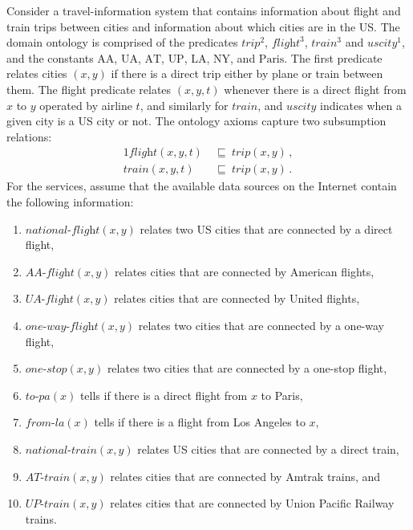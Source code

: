 \documentclass{llncs}
\newcommand{\orule}{\sqsubseteq}
\newcommand{\trip}{\textit{trip}}
\newcommand{\AAflight}{\textit{AA-flight}}
\newcommand{\UAflight}{\textit{UA-flight}}
\newcommand{\ATtrain}{\textit{AT-train}}
\newcommand{\UPtrain}{\textit{UP-train}}
\newcommand{\flight}{\textit{flight}}
\newcommand{\train}{\textit{train}}
\newcommand{\UScity}{\textit{uscity}}
\renewcommand{\AA}{\text{AA}}
\newcommand{\UA}{\text{UA}}
\newcommand{\AT}{\text{AT}}
\newcommand{\UP}{\text{UP}}
\newcommand{\PA}{\text{Paris}}
\newcommand{\NY}{\text{NY}}
\newcommand{\LA}{\text{LA}}
\newcommand{\nationaltlight}{\textit{national-flight}}
\newcommand{\onewayflight}{\textit{one-way-flight}}
\newcommand{\nationaltrain}{\textit{national-train}}
\newcommand{\onestop}{\textit{one-stop}}
\newcommand{\toPA}{\textit{to-pa}}
\newcommand{\fromLA}{\textit{from-la}}
\begin{document}
Consider a travel-information system that contains information about
flight and train trips between cities and information about which cities
are in the US. The domain ontology is comprised of the predicates
$\trip^2$, $\flight^3$, $\train^3$ and $\UScity^1$, and the constants
$\AA$, $\UA$, $\AT$, $\UP$, $\LA$, $\NY$, and $\PA$.
The first predicate relates cities $(x,y)$ if there is a direct
trip either by plane or train between them.
The flight predicate relates $(x,y,t)$ whenever there is a direct flight
from $x$ to $y$ operated by airline $t$, and similarly for $\train$,
and $\UScity$ indicates when a given city is a US city or not.
The ontology axioms capture two subsumption relations:
\begin{alignat*}{1}
\flight(x,y,t)\  &\orule\ \trip(x,y)\,, \\
\train(x,y,t)\   &\orule\ \trip(x,y)\,.
\end{alignat*}
For the services, assume that the available data sources on the
Internet contain the following information:
\begin{enumerate}[--]
\item $\nationaltlight(x,y)$ relates two US cities that are connected by a direct flight,
\item $\AAflight(x,y)$ relates cities that are connected by American flights,
\item $\UAflight(x,y)$ relates cities that are connected by United flights,
\item $\onewayflight(x,y)$ relates two cities that are connected by a one-way flight,
\item $\onestop(x,y)$ relates two cities that are connected by a one-stop flight,
\item $\toPA(x)$ tells if there is a direct flight from $x$ to Paris,
\item $\fromLA(x)$ tells if there is a flight from Los Angeles to $x$,
\item $\nationaltrain(x,y)$ relates US cities that are connected by a direct train,
\item $\ATtrain(x,y)$ relates cities that are connected by Amtrak trains, and
\item $\UPtrain(x,y)$ relates cities that are connected by Union Pacific Railway trains.
\end{enumerate}
\end{document}
